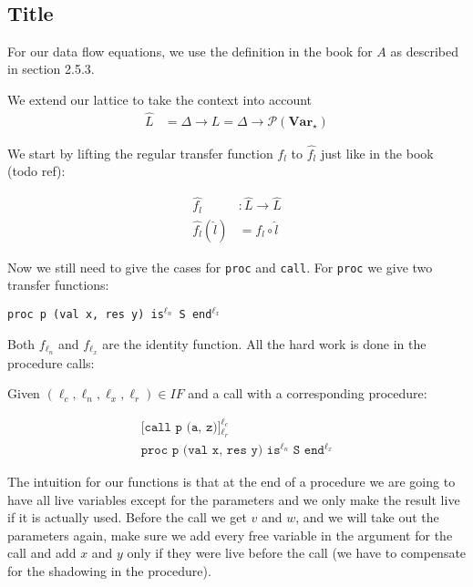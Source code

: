 \documentclass[a4wide,12pt]{article}
\theoremstyle{definition}
\theoremstyle{plain}
\theoremstyle{remark}
\def\pset#1{\mathcal{P}(#1)}
\def\Var {\mathbf{Var}}
\begin{document}
\section{~} 

\subsection{Title}

For our data flow equations, we use the definition in the book for $A$ as
described in section 2.5.3.

We extend our lattice to take the context into account
\begin{align}
\widehat{L} & = \Delta \to L = \Delta \to \pset{\Var_\star}
\end{align}

We start by lifting the regular transfer function $f_l$ to $\widehat{f_l}$ just
like in the book (todo ref):

\begin{align}
\widehat{f_l} & : \widehat{L} \to \widehat {L} \\
\widehat{f_l} (\widehat{l}) & = f_l \circ \widehat{l}
\end{align}

Now we still need to give the cases for \texttt{proc} and \texttt{call}. For
\texttt{proc} we give two transfer functions:

\texttt{proc p (val x, res y) is$^{\ell_n}$ S end$^{\ell_x}$}

Both $f_{\ell_n}$ and $f_{\ell_x}$ are the identity function. All the hard work is
done in the procedure calls:

Given $(\ell_c, \ell_n, \ell_x, \ell_r) \in IF$ and a call with a corresponding
procedure:

\begin{align}
\texttt{[call p (a, z)]$^{\ell_c}_{\ell_r}$}\\
\texttt{proc p (val x, res y) is$^{\ell_n}$ S end$^{\ell_x}$}
\end{align}

The intuition for our functions is that at the end of a procedure we are going
to have all live variables except for the parameters and we only make the result
live if it is actually used. Before the call we get $v$ and $w$, and we will
take out the parameters again, make sure we add every free variable in the
argument for the call and add $x$ and $y$ only if they were live before the call
(we have to compensate for the shadowing in the procedure).
 
\end{document}
